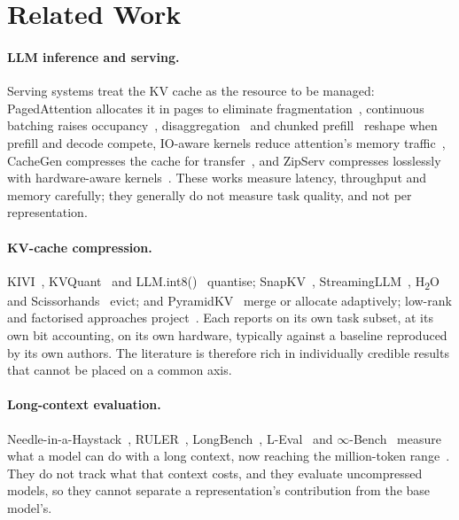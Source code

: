 \documentclass[sigplan,10pt,anonymous,review,nonacm]{acmart}
\begin{document}
\section{Related Work}
\label{sec:related}

\paragraph{LLM inference and serving.}
Serving systems treat the KV cache as the resource to be managed:
PagedAttention allocates it in pages to eliminate
fragmentation~\cite{kwon2023pagedattention}, continuous batching raises
occupancy~\cite{yu2022orca}, disaggregation~\cite{zhong2024distserve} and
chunked prefill~\cite{agrawal2024sarathi} reshape when prefill and decode
compete, IO-aware kernels reduce attention's memory
traffic~\cite{dao2022flashattention}, CacheGen compresses the cache for
transfer~\cite{liu2024cachegen}, and ZipServ compresses losslessly with
hardware-aware kernels~\cite{fan2026zipserv}. These works measure latency,
throughput and memory carefully; they generally do not measure task quality,
and not per representation.

\paragraph{KV-cache compression.}
KIVI~\cite{liu2024kivi}, KVQuant~\cite{hooper2024kvquant} and
LLM.int8()~\cite{dettmers2022llmint8} quantise; SnapKV~\cite{li2024snapkv},
StreamingLLM~\cite{xiao2023streamingllm}, H\textsubscript{2}O~\cite{zhang2023h2o}
and Scissorhands~\cite{liu2023scissorhands} evict;
\citet{ge2023model} and PyramidKV~\cite{zhang2024pyramidkv} merge or allocate
adaptively; low-rank and factorised approaches
project~\cite{sharma2023truth,dkvpreprint}. Each reports on its own task
subset, at its own bit accounting, on its own hardware, typically against a
baseline reproduced by its own authors. The literature is therefore rich in
individually credible results that cannot be placed on a common axis.

\paragraph{Long-context evaluation.}
Needle-in-a-Haystack~\cite{kamradt2023needle}, RULER~\cite{hsieh2024ruler},
LongBench~\cite{bai2023longbench}, L-Eval~\cite{an2023leval} and
$\infty$-Bench~\cite{zhang2024infinitebench} measure what a model can do with
a long context, now reaching the million-token range~\cite{reid2024gemini}.
They do not track what that context
costs, and they evaluate uncompressed models, so they cannot separate a
representation's contribution from the base model's.
\end{document}
